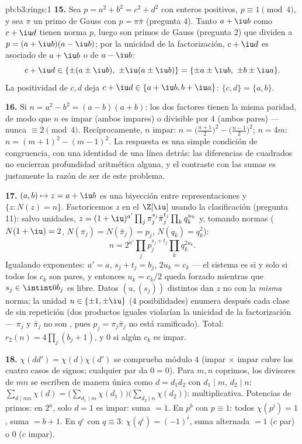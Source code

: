 \begin{solution}{pb:b3:rings:1}
\textbf{15.} Sea $p = a^2 + b^2 = c^2 + d^2$ con enteros positivos,
$p \equiv 1 \pmod 4$, y sea $\pi$ un primo de Gauss con $p = \pi\bar\pi$
(pregunta 4). Tanto $a + \iu b$ como $c + \iu d$ tienen norma $p$, luego
son primos de Gauss (pregunta 2) que dividen a
$p = (a+\iu b)(a - \iu b)$; por la unicidad de la factorización, $c +
\iu d$ es asociado de $a + \iu b$ o de $a - \iu b$:
\[
c + \iu d \in \{\pm(a \pm \iu b),\ \pm\iu(a \pm \iu b)\}
= \{\pm a \pm \iu b,\ \pm b \pm \iu a\}.
\]
La positividad de $c, d$ deja $c + \iu d \in \{a + \iu b, b + \iu
a\}$: $\{c, d\} = \{a, b\}$.

\textbf{16.} Si $n = a^2 - b^2 = (a-b)(a+b)$: los dos factores tienen la
misma paridad, de modo que $n$ es impar (ambos impares) o divisible por
$4$ (ambos pares) --- nunca $\equiv 2 \pmod 4$. Recíprocamente, $n$
impar: $n = \bigl(\frac{n+1}2\bigr)^2 -
\bigl(\frac{n-1}2\bigr)^2$; $n = 4m$: $n = (m+1)^2 - (m-1)^2$. La
respuesta es una simple condición de congruencia, con una identidad de
una línea detrás: las diferencias de cuadrados no encierran profundidad
aritmética alguna, y el contraste con las sumas es justamente la razón
de ser de este problema.

\textbf{17.} $(a, b) \mapsto z = a + \iu b$ es una biyección entre
representaciones y $\{z : N(z) = n\}$. Factoricemos $z$ en el
 $\Z[\iu]$ usando la clasificación
(pregunta 11): salvo unidades,
$z = (1+\iu)^{a'}\prod_j\pi_j^{s_j}\bar\pi_j^{t_j}
\prod_kq_k^{u_k}$ y, tomando normas ($N(1+\iu) = 2$,
$N(\pi_j) = N(\bar\pi_j) = p_j$, $N(q_k) = q_k^2$):
\[
n = 2^{a'}\prod_jp_j^{s_j + t_j}\prod_kq_k^{2u_k} .
\]
Igualando exponentes: $a' = a$, $s_j + t_j = b_j$, $2u_k = c_k$ --- el
sistema es  si y solo si todos
los $c_k$ son pares, y entonces $u_k = c_k/2$ queda forzado mientras que
$s_j \in \intint0{b_j}$ es libre. Datos $(u, (s_j))$ distintos dan $z$
no  con la \emph{misma} norma; la unidad
$u \in \{\pm1, \pm\iu\}$ (4 posibilidades) enumera después cada clase de
 sin repetición (dos productos iguales violarían la unicidad de
la factorización --- $\pi_j$ y $\bar\pi_j$ no son , pues $p_j =
\pi_j\bar\pi_j$ no está ramificado). Total: $r_2(n) =
4\prod_j(b_j + 1)$, y $0$ si algún $c_k$ es impar.

\textbf{18.} $\chi(dd') = \chi(d)\chi(d')$ se comprueba módulo $4$
(impar $\times$ impar cubre los cuatro casos de signos; cualquier par da
$0 = 0$). Para $m, n$ coprimos, los divisores de $mn$ se escriben de
manera única como $d = d_1d_2$ con $d_1 \mid m$, $d_2 \mid n$:
$\sum_{d \mid mn}\chi(d) = \bigl(\sum_{d_1\mid
m}\chi(d_1)\bigr)\bigl(\sum_{d_2\mid n}\chi(d_2)\bigr)$:
multiplicativa. Potencias de primos: en $2^a$, solo $d = 1$ es impar:
suma $= 1$. En $p^b$ con $p \equiv 1$: todos $\chi(p^i) = 1$, suma
$= b + 1$. En $q^c$ con $q \equiv 3$: $\chi(q^i) =
(-1)^i$, suma alternada $= 1$ ($c$ par) o $0$ ($c$ impar).


\end{solution}
